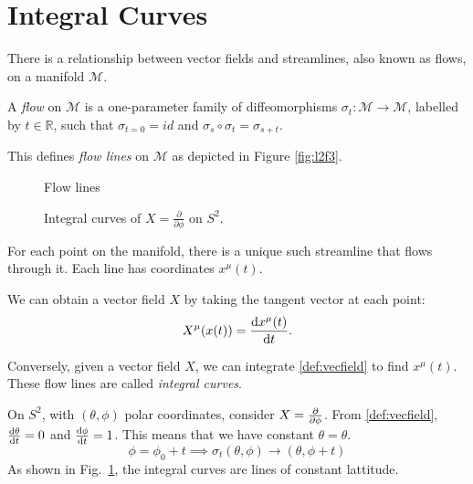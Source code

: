 \section{Integral Curves}%
\label{sec:integral_curves}

There is a relationship between vector fields and streamlines, also known as flows, on a manifold $\mathcal{M}$.

\begin{definition}[flow]
  A \emph{flow} on $\mathcal{M}$ is a one-parameter family of diffeomorphisms $\sigma_t: \mathcal{M} \to \mathcal{M}$, labelled by $t \in \mathbb{R}$, such that $\sigma_{t = 0} = id$ and $\sigma_s \circ \sigma_t = \sigma_{s + t}.$ 
\end{definition}
This defines \emph{flow lines} on $\mathcal{M}$ as depicted in Figure \ref{fig:l2f3}.
\begin{figure}[tbhp]
  \centering
  \begin{minipage}[t]{0.5\textwidth}
    \centering
    \def\svgwidth{0.9\columnwidth}
    
    \caption{Flow lines}
    \label{fig:l2f3}
  \end{minipage}%
  \begin{minipage}[t]{0.5\textwidth}
    \centering
    \def\svgwidth{0.6\columnwidth}
    
    \caption{Integral curves of $X = \frac{\partial }{\partial \phi}$  on $S^2$.}
    \label{fig:l2f4}
  \end{minipage}
\end{figure}
For each point on the manifold, there is a unique such streamline that flows through it.
Each line has coordinates $x^\mu(t)$.

We can obtain a vector field $X$ by taking the tangent vector at each point:
 \begin{equation}
   \label{def:vecfield}
   X^\mu(x(t)) = \dv{x^\mu(t)}{t}.
\end{equation}
\begin{definition}
  Conversely, given a vector field $X$, we can integrate \eqref{def:vecfield} to find $x^\mu(t)$.
  These flow lines are called \emph{integral curves}.
\end{definition}

\begin{example}[]
  On $S^2$, with $(\theta, \phi)$ polar coordinates, consider $X = \pdv{}{\phi}$.
  From \eqref{def:vecfield}, $\dv{\theta}{t} = 0$ and $\dv{\phi}{t} = 1$. This means that we have constant $\theta = \theta$.
  \begin{equation}
    \phi = \phi_0 + t \implies \sigma_t (\theta, \phi) \rightarrow (\theta, \phi + t)
  \end{equation}
  As shown in Fig.~\ref{fig:l2f4}, the integral curves are lines of constant lattitude.
\end{example}
